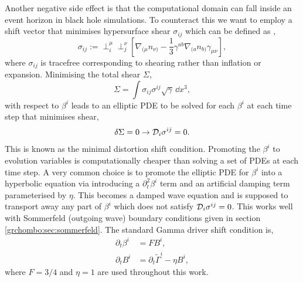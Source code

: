  Another negative side effect is that the computational domain can fall inside an event horizon in black hole simulations. To counteract this we want to employ a shift vector that minimises hypersurface shear $\sigma_{ij}$ which can be defined as \cite{smarr1978kinematical}, 
\begin{equation} \sigma_{ij}:= \perp^\mu_i \perp^\nu_j \left[\nabla_{(\mu} n_{\nu)}-\frac{1}{3}\gamma^{ab}\nabla_{(a} n_{b)} \gamma_{\mu\nu}\right], \end{equation}
where $\sigma_{ij}$ is tracefree corresponding to shearing rather than inflation or expansion. Minimising the total shear $\Sigma$,
\begin{equation} \Sigma = \int \sigma_{ij}\sigma^{ij}\sqrt{\gamma}\,\dd x^3,\end{equation}
with respect to $\beta^i$ leads to an elliptic PDE to be solved for each $\beta^i$ at each time step that minimises shear, 
\begin{equation} \delta \Sigma = 0 \rightarrow \mathcal{D}_i\sigma^{ij}=0.\end{equation}
This is known as the minimal distortion shift condition. Promoting the $\beta^i$ to evolution variables is computationally cheaper than solving a set of PDEs at each time step. A very common choice is to promote the elliptic PDE for $\beta^i$ into a hyperbolic equation via introducing a $\partial_t^2\beta^i$ term and an artificial damping term parameterised by $\eta$. This becomes a damped wave equation and is supposed to transport away any part of $\beta^i$ which does not satisfy $\mathcal{D}_i \sigma^{ij}=0$. This works well with Sommerfeld (outgoing wave) boundary conditions given in section \ref{grchombo:sec:sommerfeld}. The standard Gamma driver shift condition is,
\begin{align} 
\partial_t \beta^i &= FB^i,\label{nr:eq:gammadriver1}\\
 \partial_t B^i &= \partial_t \tilde{\Gamma}^i - \eta B^i,\label{nr:eq:gammadriver2}\end{align}
where $F=3/4$ and $\eta=1$ are used throughout this work.

